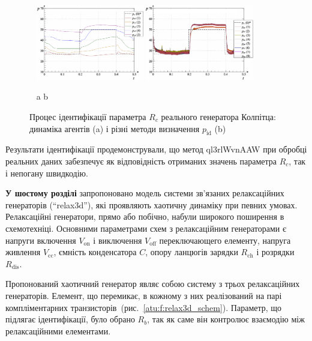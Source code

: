 \documentclass[a4paper,13pt]{atuaref}
\newcommand{\Tidx}[1]{%
  _\mathrm{#1}
}
\begin{document}
\begin{figure}[htb!]
  \centerline{
    ~ \hfill
    \includegraphics[width=0.42\textwidth]{p6/p/r/colp_real_id-p_t_pi_ql3rlWvnAAW_real_d_0_xl.png}
    \hfill
    \includegraphics[width=0.42\textwidth]{p6/p/r/colp_real_id-p_t_p_ql3rlWvnAAW_real_d_0_xl.png}
    \hfill ~
  }
  \vspace{-1.5ex}
  \begin{center}
    ~ \hfill a \hfill\hfill b \hfill ~
  \end{center}
  \vspace{-2.5ex}
  \caption{Процес ідентифікації параметра $R_c$ реального генератора Колпітца:
  динаміка агентів (a) і різні методи визначення $p_\mathrm{id}$ (b)}
  \label{atu:f:colp_r_id_1}
\end{figure}

Результати ідентифікації продемонстрували, що метод ql3rlWvnAAW
при обробці реальних даних забезпечує як відповідність отриманих значень параметра $R_c$,
так і непогану швидкодію.



\textbf{У шостому розділі}
запропоновано модель
системи зв'язаних релаксаційних генераторів (``relax3d''),
які проявляють хаотичну динаміку при певних умовах.
Релаксаційні генератори, прямо або побічно, набули широкого поширення в схемотехніці.
Основними параметрами схем з релаксаційним генераторами є напруги включення
$V\Tidx{on}$ і виключення $V \Tidx{off}$ переключающего елементу,
напруга живлення $V\Tidx{cc}$, ємність конденсатора $C$, опору ланцюгів
зарядки $R\Tidx{ch}$ і розрядки $R\Tidx {dis}$.

Пропонований хаотичний генератор являє собою систему з трьох релаксаційних
генераторів. Елемент, що перемикає, в кожному з них реалізований на парі
компліментарних транзисторів~(рис.~\ref{atu:f:relax3d_schem}).
Параметр, що підлягає ідентифікації, було обрано $R_b$,
так як саме він контролює взаємодію між релаксаційними елементами.
\end{document}

